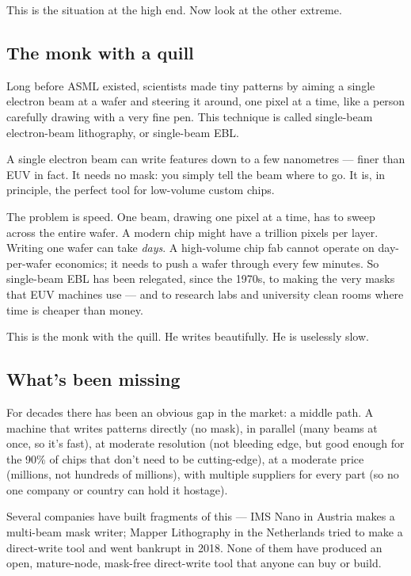 \documentclass[11pt,letterpaper]{article}
\begin{document}
This is the situation at the high end. Now look at the other extreme.

\subsection{The monk with a quill}

Long before ASML existed, scientists made tiny patterns by aiming a single electron beam at a wafer and steering it around, one pixel at a time, like a person carefully drawing with a very fine pen. This technique is called single-beam electron-beam lithography, or single-beam EBL.

A single electron beam can write features down to a few nanometres --- finer than EUV in fact. It needs no mask: you simply tell the beam where to go. It is, in principle, the perfect tool for low-volume custom chips.

The problem is speed. One beam, drawing one pixel at a time, has to sweep across the entire wafer. A modern chip might have a trillion pixels per layer. Writing one wafer can take \emph{days}. A high-volume chip fab cannot operate on day-per-wafer economics; it needs to push a wafer through every few minutes. So single-beam EBL has been relegated, since the 1970s, to making the very masks that EUV machines use --- and to research labs and university clean rooms where time is cheaper than money.

This is the monk with the quill. He writes beautifully. He is uselessly slow.

\subsection{What's been missing}

For decades there has been an obvious gap in the market: a middle path. A machine that writes patterns directly (no mask), in parallel (many beams at once, so it's fast), at moderate resolution (not bleeding edge, but good enough for the 90\% of chips that don't need to be cutting-edge), at a moderate price (millions, not hundreds of millions), with multiple suppliers for every part (so no one company or country can hold it hostage).

Several companies have built fragments of this --- IMS Nano in Austria makes a multi-beam mask writer; Mapper Lithography in the Netherlands tried to make a direct-write tool and went bankrupt in 2018. None of them have produced an open, mature-node, mask-free direct-write tool that anyone can buy or build.
\end{document}
